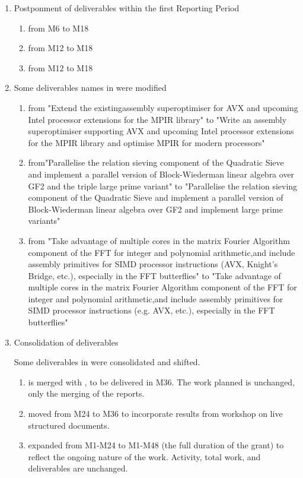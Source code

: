 \begin{enumerate}
\item Postponment of deliverables within the first Reporting Period
\begin{enumerate}
\item {} from M6 to M18
\item {} from M12 to M18
\item {} from M12 to M18
\end{enumerate}

\item Some deliverables names in  were modified
\begin{enumerate}
\item {} from "Extend the existingassembly superoptimiser
for AVX and upcoming Intel processor extensions for the MPIR library" to "Write an assembly
superoptimiser supporting AVX and upcoming Intel processor extensions for the MPIR library
and optimise MPIR for modern processors"
\item {} from"Parallelise the relation sieving component of the
Quadratic Sieve and implement a parallel version of Block-Wiederman linear algebra over GF2
and the triple large prime variant" to "Parallelise the relation sieving component of the
Quadratic Sieve and implement a parallel version of Block-Wiederman linear algebra over GF2
and implement large prime variants"
\item {} from "Take advantage of multiple cores in the matrix Fourier Algorithm
component of the FFT for integer and polynomial arithmetic,and include assembly primitives for
SIMD processor instructions (AVX, Knight's Bridge, etc.), especially in the FFT butterflies" to
"Take advantage of multiple cores in the matrix Fourier Algorithm component of the FFT for
integer and polynomial arithmetic,and include assembly primitives for SIMD processor
instructions (e.g. AVX, etc.), especially in the FFT butterflies"
\end{enumerate}

\item  Consolidation of  deliverables

Some deliverables in  were consolidated and shifted.

\begin{enumerate}
\item {} is merged with , to be delivered in M36.
    The work planned is unchanged, only the merging of the reports.
\item {} moved from M24 to M36 to incorporate results
    from workshop on live structured documents.
\item {} expanded from M1-M24 to M1-M48 (the full duration of the grant)
    to reflect the ongoing nature of the work. Activity, total work, and deliverables are unchanged.
\end{enumerate}


\end{enumerate}

